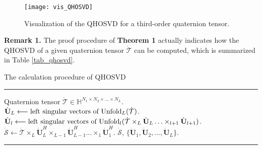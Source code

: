 \documentclass[journal]{IEEEtran}
\begin{document}
\begin{figure}[htbp]
	\centering
	\texttt{[image: vis\_QHOSVD]}
	\caption{Visualization of the QHOSVD for a third-order quaternion tensor.}
	\label{vis_QHOSVD}
\end{figure}

\textbf{Remark 1.} The proof procedure of \textbf{Theorem 1} actually indicates how the QHOSVD of a given quaternion tensor $\dot{\mathcal{T}}$ can be computed, which is summarized in Table \ref{tab_qhosvd}.
\begin{table}[htbp]
	\caption{The calculation procedure of QHOSVD}
	\hrule
	\label{tab_qhosvd}
	\begin{algorithmic}[1]
		\REQUIRE Quaternion tensor $\dot{\mathcal{T}}\in\mathbb{H}^{N_{1}\times N_{2} \times\ldots \times N_{L}}$.
		\STATE $\dot{\mathbf{U}}_{L}\longleftarrow  \text{left singular vectors of}\   {\rm{Unfold}}_{L}(\dot{\mathcal{T}})$.
		\STATE  $\dot{\mathbf{U}}_{l}\longleftarrow  \text{left singular vectors of}\   {\rm{Unfold}}_{l}(\dot{\mathcal{T}}\times_{L}\dot{\mathbf{U}}_{L}\ldots\times_{l+1}\dot{\mathbf{U}}_{l+1})$.
		\ENDFOR
		\STATE  $\dot{\mathcal{S}}\longleftarrow \dot{\mathcal{T}}\times_{L}\dot{\mathbf{U}}_{L}^{H}\times_{L-1}\dot{\mathbf{U}}_{L-1}^{H}\ldots\times_{1}\dot{\mathbf{U}}_{1}^{H}$.
		\ENSURE $\dot{\mathcal{S}}$, $\{\dot{\mathbf{U}}_{1},\dot{\mathbf{U}}_{2},\ldots,\dot{\mathbf{U}}_{L}\}$.
	\end{algorithmic}
	\hrule
\end{table}
\end{document}
